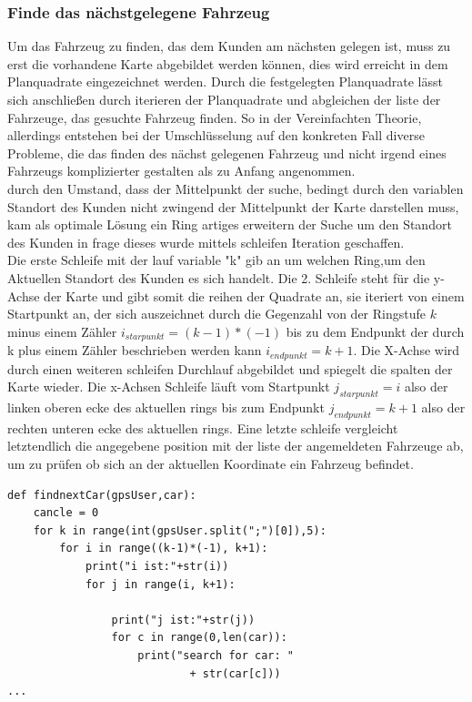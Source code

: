 \subsubsection{Finde das nächstgelegene Fahrzeug}
Um das Fahrzeug  zu finden,  das dem Kunden am nächsten  gelegen ist, muss zu erst die vorhandene Karte abgebildet werden können, dies wird erreicht in dem Planquadrate eingezeichnet werden. Durch die festgelegten Planquadrate lässt sich anschließen durch iterieren der Planquadrate und abgleichen der liste der Fahrzeuge, das gesuchte Fahrzeug finden. So in der Vereinfachten Theorie, allerdings entstehen bei der Umschlüsselung auf den konkreten Fall diverse Probleme, die das finden des nächst gelegenen Fahrzeug und nicht irgend eines Fahrzeugs komplizierter gestalten als zu Anfang angenommen.\\
durch den Umstand, dass der Mittelpunkt der suche, bedingt durch den variablen Standort des Kunden nicht zwingend der Mittelpunkt der Karte darstellen muss, kam als optimale Lösung ein Ring artiges erweitern der Suche um den Standort des Kunden in frage dieses wurde mittels schleifen Iteration geschaffen.\\
Die erste Schleife mit der lauf variable "k" gib an um welchen Ring,um den Aktuellen Standort des Kunden es sich handelt. Die 2. Schleife steht für die y-Achse der Karte und gibt somit die reihen der Quadrate an, sie iteriert von einem Startpunkt an, der sich auszeichnet durch die Gegenzahl von der Ringstufe $k$ minus einem Zähler $i_{starpunkt} = (k-1)*(-1)$ bis zu dem Endpunkt der durch k plus einem Zähler beschrieben werden kann $i_{endpunkt} = k+1$. Die X-Achse wird durch einen weiteren schleifen Durchlauf abgebildet und spiegelt die spalten der Karte wieder. Die x-Achsen Schleife läuft vom Startpunkt $j_{starpunkt} = i $ also der linken oberen ecke des aktuellen rings bis zum Endpunkt $j_{endpunkt} = k+1$ also der rechten unteren ecke des aktuellen rings. Eine letzte schleife vergleicht letztendlich die angegebene position mit der liste der angemeldeten Fahrzeuge ab, um zu prüfen ob sich an der aktuellen Koordinate ein Fahrzeug befindet.
\begin{lstlisting}
def findnextCar(gpsUser,car):
    cancle = 0
    for k in range(int(gpsUser.split(";")[0]),5):
        for i in range((k-1)*(-1), k+1):
            print("i ist:"+str(i))
            for j in range(i, k+1):

                print("j ist:"+str(j))
                for c in range(0,len(car)):
                    print("search for car: "
                    		+ str(car[c]))
...
\end{lstlisting}

